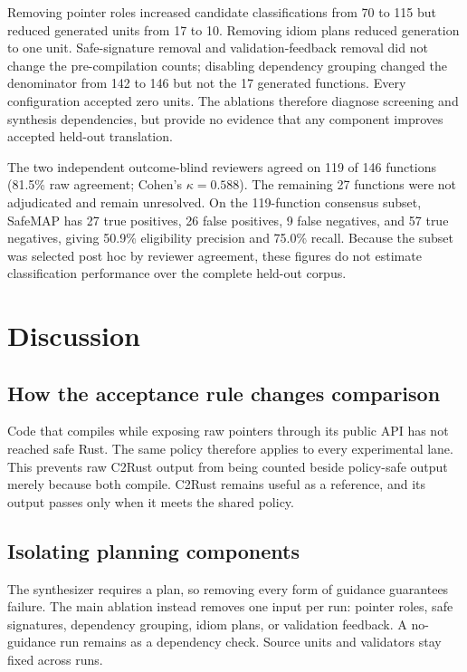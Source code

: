 \documentclass[conference]{IEEEtran}
\newcommand{\tool}{SafeMAP\xspace}
\begin{document}


Removing pointer roles increased candidate classifications from 70 to 115 but
reduced generated units from 17 to 10. Removing idiom plans reduced generation
to one unit. Safe-signature removal and validation-feedback removal did not
change the pre-compilation counts; disabling dependency grouping changed the
denominator from 142 to 146 but not the 17 generated functions. Every
configuration accepted zero units. The ablations therefore diagnose screening
and synthesis dependencies, but provide no evidence that any component
improves accepted held-out translation.



The two independent outcome-blind reviewers agreed on 119 of 146 functions
(81.5\% raw agreement; Cohen's $\kappa=0.588$). The remaining 27 functions were
not adjudicated and remain unresolved. On the 119-function consensus subset,
\tool has 27 true positives, 26 false positives, 9 false negatives, and 57 true
negatives, giving 50.9\% eligibility precision and 75.0\% recall. Because the
subset was selected post hoc by reviewer agreement, these figures do not
estimate classification performance over the complete held-out corpus.

\section{Discussion}

\subsection{How the acceptance rule changes comparison}

Code that compiles while exposing raw pointers through its public API has not
reached safe Rust. The same policy therefore applies to every experimental
lane. This prevents raw C2Rust output from being counted beside policy-safe
output merely because both compile. C2Rust remains useful as a reference, and
its output passes only when it meets the shared policy.

\subsection{Isolating planning components}

The synthesizer requires a plan, so removing every form of guidance guarantees
failure. The main ablation instead removes one input per run: pointer roles,
safe signatures, dependency grouping, idiom plans, or validation feedback. A
no-guidance run remains as a dependency check. Source units and validators stay
fixed across runs.
\end{document}
